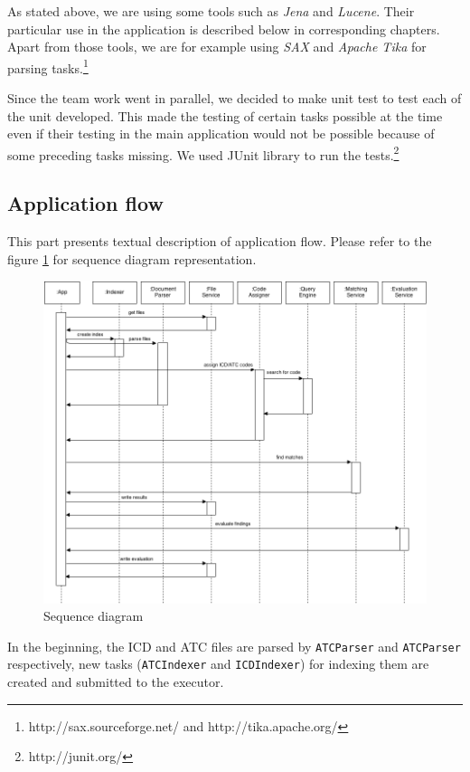 \documentclass{article}
\begin{document}
As stated above, we are using some tools such as \emph{Jena} and \emph{Lucene}. Their particular use in the application is described below in corresponding chapters. Apart from those tools, we are for example using \emph{SAX} and \emph{Apache Tika} for parsing tasks.\footnote{http://sax.sourceforge.net/ and http://tika.apache.org/}

Since the team work went in parallel, we decided to make unit test to test each of the unit developed. This made the testing of certain tasks possible at the time even if their testing in the main application would not be possible because of some preceding tasks missing. We used JUnit library to run the tests.\footnote{http://junit.org/}

\subsection{Application flow}

This part presents textual description of application flow. Please refer to the figure \ref{fig:seq} for sequence diagram representation.

\begin{figure}[h!]
    \centering
    \includegraphics[width=1.0\textwidth]{seq}
    \caption{Sequence diagram}
    \label{fig:seq}
\end{figure}

In the beginning, the ICD and ATC files are parsed by \texttt{ATCParser} and \texttt{ATCParser} respectively, new tasks (\texttt{ATCIndexer} and \texttt{ICDIndexer}) for indexing  them are created and submitted to the executor.
\end{document}
